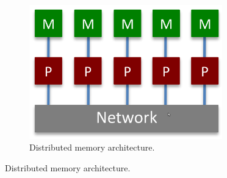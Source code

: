 \begin{description}
\begin{figure}
\begin{subfigure}{0.55\textwidth}
 	\end{subfigure}%
 	\begin{subfigure}{0.45\textwidth}
 		\centering
 		\caption{Distributed memory architecture.}
 		\label{fig:distribuiteMemory}
 		\includegraphics[width=0.92\textwidth]{./images/parallel_programming/distribuitedMemory}
 	\end{subfigure}%
 	\label{fig:UMA_NUMA}
 \end{figure}
 

 
 

\end{description}
